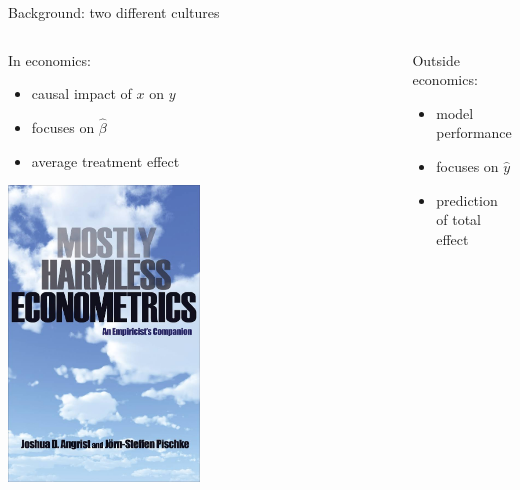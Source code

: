 \documentclass{beamer}
\begin{document}
\begin{frame}{Background: two different cultures \citep{breiman2001statistical}}
\begin{columns}
	\begin{column}{0.5\textwidth}
		In economics: 
		\begin{itemize}
			\item \alert{causal} impact of $x$ on $y$
			\item \alert{focuses} on $\hat{\beta}$
			\item \alert{average} treatment effect
		\end{itemize}
		\begin{center}
			\includegraphics[width=0.5\textwidth]{../fig/harmless}      
		\end{center}
	\end{column}\pause
	\begin{column}{0.5\textwidth} 
		Outside economics: 
		\begin{itemize}
			\item \alert{model performance } 
			\item \alert{focuses} on $\hat{y}$
			\item \alert{prediction} of total effect
		\end{itemize}
		\begin{center}

\end{center}
\end{column}
\end{columns}
\end{frame}
\end{document}
